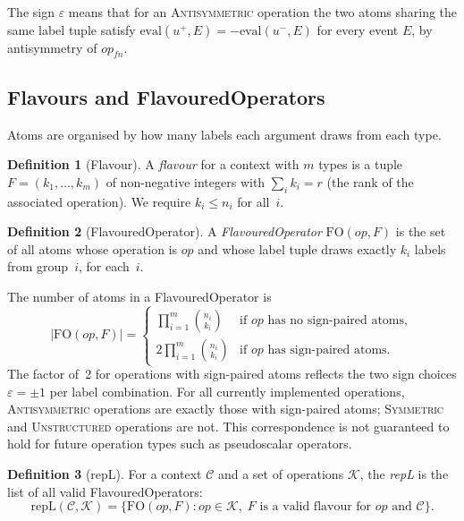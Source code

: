 \documentclass[11pt,a4paper]{article}
\theoremstyle{definition}
\newtheorem{definition}{Definition}[section]
\theoremstyle{plain}
\theoremstyle{remark}
\newcommand{\eval}{\mathrm{eval}}
\newcommand{\fo}{\mathrm{FO}}
\newcommand{\repL}{\mathrm{repL}}
\newcommand{\comb}[2]{\binom{#1}{#2}}
\begin{document}
The sign $\varepsilon$ means that for an \textsc{Antisymmetric} operation the
two atoms sharing the same label tuple satisfy
$\eval(u^{+}, E) = -\eval(u^{-}, E)$ for every event $E$, by antisymmetry of
$\mathit{op}_{fn}$.

\subsection{Flavours and FlavouredOperators}

Atoms are organised by how many labels each argument draws from each type.

\begin{definition}[Flavour]
A \emph{flavour} for a context with $m$ types is a tuple $F = (k_1,\ldots,k_m)$
of non-negative integers with $\sum_i k_i = r$ (the rank of the associated
operation).  We require $k_i \le n_i$ for all~$i$.
\end{definition}

\begin{definition}[FlavouredOperator]
A \emph{FlavouredOperator} $\fo(\mathit{op}, F)$ is the set of all atoms whose
operation is $\mathit{op}$ and whose label tuple draws exactly $k_i$ labels from
group~$i$, for each~$i$.
\end{definition}

The number of atoms in a FlavouredOperator is
\begin{equation}\label{eq:fo-count}
  |\fo(\mathit{op}, F)| =
  \begin{cases}
    \displaystyle\prod_{i=1}^m \comb{n_i}{k_i}
      & \text{if $\mathit{op}$ has no sign-paired atoms},\\[8pt]
    \displaystyle 2\prod_{i=1}^m \comb{n_i}{k_i}
      & \text{if $\mathit{op}$ has sign-paired atoms.}
  \end{cases}
\end{equation}
The factor of~2 for operations with sign-paired atoms reflects the two sign
choices $\varepsilon = \pm 1$ per label combination.  For all currently
implemented operations, \textsc{Antisymmetric} operations are exactly those
with sign-paired atoms; \textsc{Symmetric} and \textsc{Unstructured}
operations are not.  This correspondence is not guaranteed to hold for future
operation types such as pseudoscalar operators.

\begin{definition}[repL]
For a context $\mathcal{C}$ and a set of operations $\mathcal{K}$, the
\emph{repL} is the list of all valid FlavouredOperators:
\[
  \repL(\mathcal{C}, \mathcal{K})
  = \bigl\{\fo(\mathit{op}, F) : \mathit{op} \in \mathcal{K},\;
    F \text{ is a valid flavour for $\mathit{op}$ and $\mathcal{C}$}\bigr\}.
\]
\end{definition}
\end{document}
